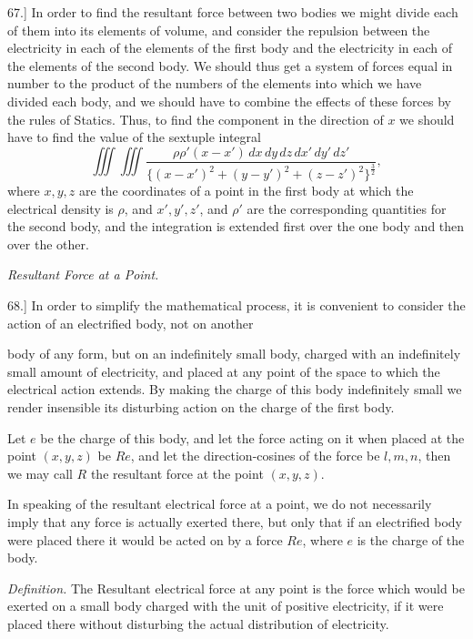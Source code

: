 \documentclass[11pt,a4paper]{article}
\begin{document}
67.] In order to find the resultant force between two bodies we might
divide each of them into its elements of volume, and consider the
repulsion between the electricity in each of the elements of the first
body and the electricity in each of the elements of the second body. We
should thus get a system of forces equal in number to the product of
the numbers of the elements into which we have divided each body, and
we should have to combine the effects of these forces by the rules of
Statics. Thus, to find the component in the direction of \(x\) we should
have to find the value of the sextuple integral
\[
\iiint\!\!\iiint
\frac{\rho\rho'(x-x')\,dx\,dy\,dz\,dx'\,dy'\,dz'}
{\{(x-x')^2+(y-y')^2+(z-z')^2\}^{\frac{3}{2}}},
\]
where \(x,y,z\) are the coordinates of a point in the first body at
which the electrical density is \(\rho\), and \(x',y',z'\), and \(\rho'\)
are the corresponding quantities for the second body, and the
integration is extended first over the one body and then over the other.

\begin{center}
\textit{Resultant Force at a Point.}
\end{center}

68.] In order to simplify the mathematical process, it is convenient
to consider the action of an electrified body, not on another

\clearpage
\setcounter{footnote}{0}

body of any form, but on an indefinitely small body, charged with an
indefinitely small amount of electricity, and placed at any point of
the space to which the electrical action extends. By making the charge
of this body indefinitely small we render insensible its disturbing
action on the charge of the first body.

Let \(e\) be the charge of this body, and let the force acting on it
when placed at the point \((x,y,z)\) be \(Re\), and let the direction-cosines
of the force be \(l,m,n\), then we may call \(R\) the resultant force at
the point \((x,y,z)\).

In speaking of the resultant electrical force at a point, we do not
necessarily imply that any force is actually exerted there, but only
that if an electrified body were placed there it would be acted on by
a force \(Re\), where \(e\) is the charge of the body.

\textit{Definition.} The Resultant electrical force at any point is the
force which would be exerted on a small body charged with the unit of
positive electricity, if it were placed there without disturbing the
actual distribution of electricity.
\end{document}
